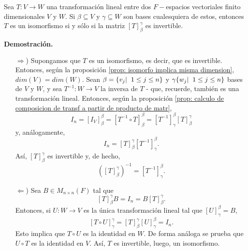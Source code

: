 \begin{teo}
Sea $T: V \longrightarrow W$ una transformación lineal entre dos
$F-$espacios vectoriales finito dimensionales $V$ y $W$.
Si $\beta \subseteq V$ y $\gamma \subseteq W$ son bases cualesquiera
de estos, entonces $T$ es un isomorfismo si y sólo si la matriz
$[T]_{\beta}^{\gamma}$ es invertible.
\end{teo}
\noindent
\textbf{Demostración.}
\begin{itemize}
	\item[$\Rightarrow$)] Supongamos que $T$ es un isomorfismo, es decir,
	que es invertible. Entonces, según la proposición 
	\ref{prop: isomorfo implica misma dimension}, $dim(V) = dim(W)$.
	Sean $\beta = \{ v_{j}  | \hspace{0.2cm} 1 \leq j \leq n \}$ y
	$\gamma \{ w_{j}  | \hspace{0.2cm} 1 \leq j \leq n \}$ bases de $V$
	y $W$, y sea $T^{-1}: W \longrightarrow V$ la inversa de $T$ - que, 
	recuerde, también es una transformación lineal. Entonces, 
	según la proposición
	\ref{prop: calculo de composicion de transf a partir de producto de matr},
	\[
	I_{n} = [I_{V}]_{\beta}^{\beta} = [T^{-1} \circ T]_{\beta}^{\beta}
	= [T^{-1}]_{\gamma}^{\beta} [T]_{\beta}^{\gamma}
	\]
	y, análogamente,
	\[
	I_{n} = [T]_{\beta}^{\gamma} [T^{-1}]_{\gamma}^{\beta}.
	\]
	Así, $[T]_{\beta}^{\gamma}$ es invertible y, de hecho,
	\begin{equation}
		\label{eq: inversa de repr matr de T}
		([T]_{\beta}^{\gamma})^{-1} = [T^{-1}]_{\gamma}^{\beta}.
	\end{equation}
	
	\item[$\Leftarrow$)] Sea $B \in M_{n \times n}(F)$ tal que
	\[
	[T]_{\beta}^{\gamma}B = I_{n} = B [T]_{\beta}^{\gamma}.
	\]
	Entonces, si $U: W \longrightarrow V$ es la única transformación lineal
	tal que $[U]_{\gamma}^{\beta} = B$, 
	\[
	[T \circ U]_{\gamma}^{\gamma} = [T]_{\beta}^{\gamma} [U]_{\gamma}^{\beta}
	= I_{n}.
	\]
	Esto implica que $T \circ U$ es la identidad en $W$. De forma
	análoga se prueba que $U \circ T$ es la identidad en $V$. Así,
	$T$ es invertible, luego, un isomorfismo.
\end{itemize}

\QEDB
\vspace{0.2cm}

